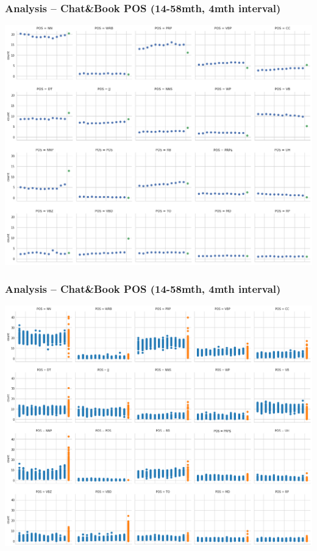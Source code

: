 \documentclass{beamer}
\begin{document}
\begin{frame}
	\frametitle{Analysis --  Chat\&Book POS (14-58mth, 4mth interval)}
	\begin{center}
		\includegraphics[width=.8\linewidth]{../real_plots/p&bavgpos.png}
	\end{center}

\end{frame}
\begin{frame}
	\frametitle{Analysis --  Chat\&Book POS (14-58mth, 4mth interval)}
	\begin{center}
		\includegraphics[width=.8\linewidth]{../real_plots/p&bposdist.png}
	\end{center}
\end{frame}
\end{document}
